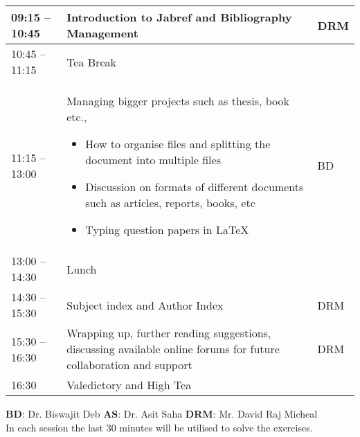 \documentclass[a4paper,12pt]{article} %
\begin{document}
\begin{longtable}{|p{.2\linewidth}|p{.7\linewidth}| p{.1\linewidth}|}
			09:15 – 10:45 & Introduction to Jabref      and    Bibliography Management & DRM\\ \hline
			10:45 – 11:15 & Tea Break                                                                                                         & \\ \hline
			 11:15 – 13:00 & Managing bigger projects such as thesis, book etc., \begin{itemize}[noitemsep]
			\item How to organise files and splitting the document into multiple files 
			\item Discussion on formats of different documents such as articles, reports, books, etc 
			\item Typing question papers in \LaTeX
		\end{itemize} & BD \\ \hline
			13:00 – 14:30 & Lunch                                                                                                             & \\ \hline
			14:30 – 15:30 & Subject index and Author Index                                                                                    & DRM \\ \hline
			15:30 – 16:30 & Wrapping up, further reading suggestions, discussing available online forums for future collaboration and support & DRM  \\ \hline
			16:30         & Valedictory and High Tea  &                          \\\hline                                                              
		\end{longtable}


\begin{flushleft}
	\textbf{BD}: Dr. Biswajit Deb \quad	\textbf{AS}: Dr. Asit Saha \quad \textbf{DRM}: Mr. David Raj Micheal \\
	In each session the last 30 minutes will be utilised to solve the exercises.
\end{flushleft}
\end{document}
